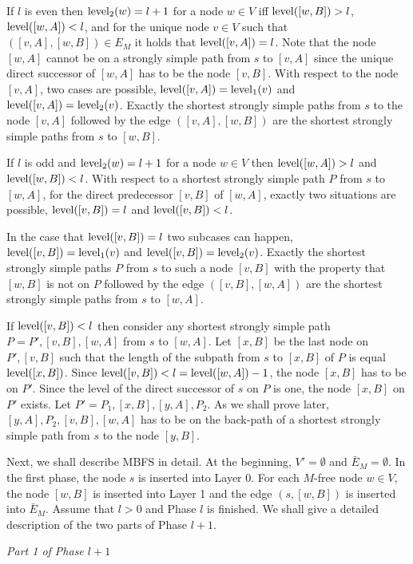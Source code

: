 \documentclass[12pt,twoside,a4paper]{article}
\def\lev{{\rm level}}
\begin{document}
\medskip
If $l$ is even then $\lev_2(w) = l+1$ for a node $w \in V$ iff $\lev([w,B]) > l$,
$\lev([w,A]) < l$, and for the unique node $v \in V$ such that $([v,A],[w,B]) \in E_M$ 
it holds that $\lev([v,A]) = l$. Note that the node $[w,A]$ cannot be on a strongly simple
path from $s$ to $[v,A]$ since the unique direct successor of $[w,A]$ has to be the node
$[v,B]$. With respect to the node $[v,A]$, two cases
are possible, $\lev([v,A]) = \lev_1(v)$ and $\lev([v,A]) = \lev_2(v)$. Exactly the shortest 
strongly simple paths from $s$ to the node $[v,A]$ followed by the edge $([v,A],[w,B])$
are the shortest strongly simple paths from $s$ to $[w,B]$.

If $l$ is odd and $\lev_2(w) = l+1$ for a node $w \in V$ then $\lev([w,A]) > l$ and 
$\lev([w,B]) < l$. With respect to a shortest strongly simple path $P$ from $s$ to $[w,A]$,
for the direct predecessor $[v,B]$ of $[w,A]$, exactly two situations are possible,
$\lev([v,B]) = l$ and $\lev([v,B]) < l$.

In the case that $\lev([v,B]) = l$ two subcases can happen, $\lev([v,B]) = \lev_1(v)$ and
$\lev([v,B]) = \lev_2(v)$. Exactly the shortest strongly simple paths $P$ from $s$ to such a 
node $[v,B]$ with the property that $[w,B]$ is not on $P$ followed by the edge 
$([v,B],[w,A])$ are the shortest strongly simple paths from $s$ to $[w,A]$.

If $\lev([v,B]) < l$ then consider any shortest strongly simple path\\ $P = P',[v,B],[w,A]$ from 
$s$ to $[w,A]$. Let $[x,B]$ be the last node on $P',[v,B]$ such that the length of the subpath
from $s$ to $[x,B]$ of $P$ is equal $\lev([x,B])$. Since $\lev([v,B]) < l = \lev([w,A]) - 1$,
the node $[x,B]$ has to be on $P'$. Since the level of the direct successor of $s$ on $P$ is
one, the node $[x,B]$ on $P'$ exists. 
Let $P' = P_1,[x,B],[y,A],P_2$. As we shall prove later,
$[y,A],P_2,[v,B],[w,A]$ has to be on the back-path of a shortest strongly simple path from $s$
to the node $[y,B]$.

\medskip
Next, we shall describe MBFS in detail.
At the beginning, $V' = \emptyset$ and $\bar{E}_M = \emptyset$.
In the first phase, the node $s$ is inserted into Layer 0. For each $M$-free node $w \in V$,
the node $[w,B]$ is inserted into Layer 1 and the edge $(s,[w,B])$ is inserted into
$\bar{E}_M$. Assume that $l > 0$ and Phase $l$ is finished. 
We shall give a detailed description of the two parts of Phase $l+1$.

\medskip
\noindent
{\em Part 1 of Phase $l+1$}
\end{document}

